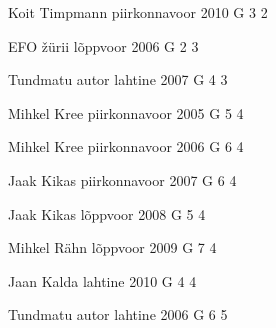 \documentclass[11pt]{article}
\begin{document}
{Koit Timpmann} %
{piirkonnavoor} %
{2010} %
{G 3} %
{2} %
{

\ifEngHint
\fi
}

{EFO žürii} %
{lõppvoor} %
{2006} %
{G 2} %
{3} %
{

\ifEngHint
\fi
}

{Tundmatu autor} %
{lahtine} %
{2007} %
{G 4} %
{3} %
{

\ifEngHint
\fi
}

{Mihkel Kree} %
{piirkonnavoor} %
{2005} %
{G 5} %
{4} %
{

\ifEngHint
\fi
}

{Mihkel Kree} %
{piirkonnavoor} %
{2006} %
{G 6} %
{4} %
{

\ifEngHint
\fi
}

{Jaak Kikas} %
{piirkonnavoor} %
{2007} %
{G 6} %
{4} %
{

\ifEngHint
\fi
}

{Jaak Kikas} %
{lõppvoor} %
{2008} %
{G 5} %
{4} %
{

\ifEngHint
\fi
}

{Mihkel Rähn} %
{lõppvoor} %
{2009} %
{G 7} %
{4} %
{

\ifEngHint
\fi
}

{Jaan Kalda} %
{lahtine} %
{2010} %
{G 4} %
{4} %
{

\ifEngHint
\fi
}

{Tundmatu autor} %
{lahtine} %
{2006} %
{G 6} %
{5} %
{

\ifEngHint
\fi
}
\end{document}
